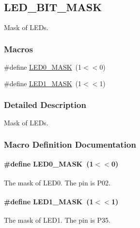 \hypertarget{group___l_e_d___b_i_t___m_a_s_k}{}\subsection{L\+E\+D\+\_\+\+B\+I\+T\+\_\+\+M\+A\+SK}
\label{group___l_e_d___b_i_t___m_a_s_k}


Mask of L\+E\+Ds.  


\subsubsection*{Macros}
\begin{DoxyCompactItemize}
\item 
\#define \hyperlink{group___l_e_d___b_i_t___m_a_s_k_gabfabde35a3e8b7ab50146a5e223bfead}{L\+E\+D0\+\_\+\+M\+A\+SK}~(1$<$$<$0)
\item 
\#define \hyperlink{group___l_e_d___b_i_t___m_a_s_k_ga669ed6e073140d069b30442bf4c08842}{L\+E\+D1\+\_\+\+M\+A\+SK}~(1$<$$<$1)
\end{DoxyCompactItemize}


\subsubsection{Detailed Description}
Mask of L\+E\+Ds. 



\subsubsection{Macro Definition Documentation}
\paragraph[{\texorpdfstring{L\+E\+D0\+\_\+\+M\+A\+SK}{LED0_MASK}}]{\setlength{\rightskip}{0pt plus 5cm}\#define L\+E\+D0\+\_\+\+M\+A\+SK~(1$<$$<$0)}\hypertarget{group___l_e_d___b_i_t___m_a_s_k_gabfabde35a3e8b7ab50146a5e223bfead}{}\label{group___l_e_d___b_i_t___m_a_s_k_gabfabde35a3e8b7ab50146a5e223bfead}
The mask of L\+E\+D0. The pin is P02. 
\paragraph[{\texorpdfstring{L\+E\+D1\+\_\+\+M\+A\+SK}{LED1_MASK}}]{\setlength{\rightskip}{0pt plus 5cm}\#define L\+E\+D1\+\_\+\+M\+A\+SK~(1$<$$<$1)}\hypertarget{group___l_e_d___b_i_t___m_a_s_k_ga669ed6e073140d069b30442bf4c08842}{}\label{group___l_e_d___b_i_t___m_a_s_k_ga669ed6e073140d069b30442bf4c08842}
The mask of L\+E\+D1. The pin is P35. 